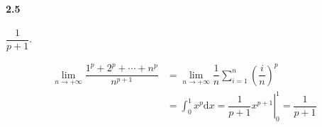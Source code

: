 \paragraph*{2.5}$\dfrac{1}{p+1}$.

\[
	\begin{aligned}
\lim_{n\to+\infty}\dfrac{1^p+2^p+\cdots+n^p}{n^{p+1}}&=\lim_{n\to+\infty}\dfrac{1}{n}\sum_{i=1}^n\left(\dfrac{i}{n}\right)^p\\
&=\int_{0}^{1}x^p\mathrm{d}x=\left.\dfrac{1}{p+1}x^{p+1}\right|_{0}^{1}=\dfrac{1}{p+1}
	\end{aligned}
\]